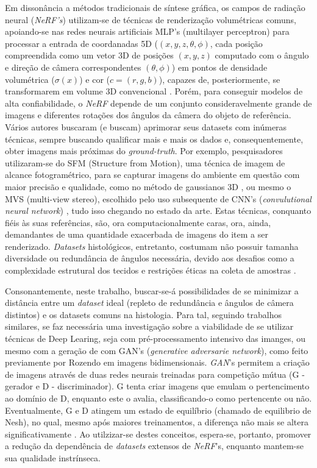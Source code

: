 Em dissonância a métodos tradicionais de síntese gráfica, os campos de radiação neural (\textit{NeRF's}) utilizam-se de técnicas de renderização volumétricas comuns, apoiando-se nas redes neurais artificiais MLP's (multilayer perceptron) para processar a entrada de coordanadas 5D ($(x, y, z, \theta, \phi)$, cada posição compreendida como um vetor 3D de posições $(x, y, z)$ computado com o ângulo e direção de câmera correspondentes $(\theta, \phi)$) em pontos de densidade volumétrica ($\sigma (x)$) e cor ($c = (r, g, b)$), capazes de, posteriormente, se transformarem em volume 3D convencional \cite{mildenhall2020nerfrepresentingscenesneural}. Porém, para conseguir modelos de alta confiabilidade, o \textit{NeRF} depende de um conjunto consideravelmente grande de imagens e diferentes rotações dos ângulos da câmera do objeto de referência. Vários autores buscaram (e buscam) aprimorar seus datasets com inúmeras técnicas, sempre buscando qualificar mais e mais os dados e, consequentemente, obter imagens mais próximas do \textit{ground-truth}. Por exemplo, pesquisadores utilizaram-se do SFM  (Structure from Motion), uma técnica de imagem de alcance fotogramétrico, para se capturar imagens do ambiente em questão com maior precisão e qualidade, como no método de gaussianos 3D \cite{kerbl3Dgaussians}, ou mesmo o MVS (multi-view stereo), escolhido pelo uso subsequente de CNN's (\textit{convulutional neural network}) \cite{chen2021mvsnerffastgeneralizableradiance}, tudo isso chegando no estado da arte. Estas técnicas, conquanto fiéis às suas referências, são, ora computacionalmente caras, ora, ainda, demandantes de uma quantidade exacerbada de imagens do item a ser renderizado. \textit{Datasets} histológicos, entretanto, costumam não possuir tamanha diversidade ou redundância de ângulos necessária, devido aos desafios como a complexidade estrutural dos tecidos e restrições éticas na coleta de amostras \cite{XUE2021101816}.

Consonantemente, neste trabalho, buscar-se-á possibilidades de se minimizar a distância entre um \textit{dataset} ideal (repleto de redundância e ângulos de câmera distintos) e os datasets comuns na histologia. Para tal, seguindo trabalhos similares, se faz necessária uma investigação sobre a viabilidade de se utilizar técnicas de Deep Learing, seja com pré-processamento intensivo das imanges, ou mesmo com a geração de com GAN's (\textit{generative adversarie network}), como feito previamente por Rozendo \cite{rozendo2024histdataaug} em imagens bidimensionais.   \textit{GAN}'s  permitem a criação de imagens através de duas redes neurais treinadas para competição mútua (G - gerador e  D - discriminador). G tenta criar imagens que emulam o pertencimento ao domínio de D, enquanto este o avalia, classificando-o como pertencente ou não. Eventualmente, G e D atingem um estado de equilíbrio (chamado de equilibrio de Nesh), no qual, mesmo após maiores treinamentos, a diferença não mais se altera significativamente \cite{goodfellow2014generativeadversarialnetworks} . Ao utilzizar-se destes conceitos, espera-se, portanto, promover a redução da dependência de \textit{datasets} extensos de \textit{NeRF}'s, enquanto mantem-se sua qualidade instrínseca.
